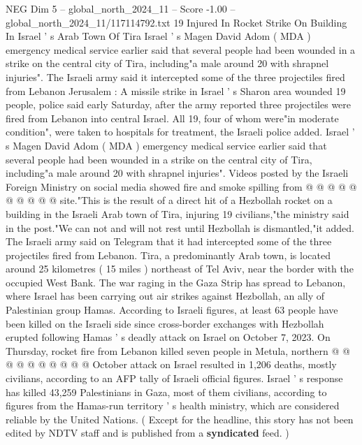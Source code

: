 \begin{textsample}{NEG Dim 5 – global\_north\_2024\_11 – Score -1.00 – global\_north\_2024\_11/117114792.txt}  \label{ex:f5_neg_413}
19 Injured In Rocket Strike On Building In Israel ' s Arab Town Of Tira Israel ' s Magen David Adom ( MDA ) emergency medical service earlier said that several people had been wounded in a strike on the central city of Tira, including"a male around 20 with shrapnel injuries".
The Israeli army said it intercepted some of the three projectiles fired from Lebanon Jerusalem : A missile strike in Israel ' s Sharon area wounded 19 people, police said early Saturday, after the army reported three projectiles were fired from Lebanon into central Israel.
All 19, four of whom were"in moderate condition", were taken to hospitals for treatment, the Israeli police added.
Israel ' s Magen David Adom ( MDA ) emergency medical service earlier said that several people had been wounded in a strike on the central city of Tira, including"a male around 20 with shrapnel injuries".
Videos posted by the Israeli Foreign Ministry on social media showed fire and smoke spilling from @ @ @ @ @ @ @ @ @ @ site."This is the result of a direct hit of a Hezbollah rocket on a building in the Israeli Arab town of Tira, injuring 19 civilians,"the ministry said in the post."We can not and will not rest until Hezbollah is dismantled,"it added.
The Israeli army said on Telegram that it had intercepted some of the three projectiles fired from Lebanon.
Tira, a predominantly Arab town, is located around 25 kilometres ( 15 miles ) northeast of Tel Aviv, near the border with the occupied West Bank.
The war raging in the Gaza Strip has spread to Lebanon, where Israel has been carrying out air strikes against Hezbollah, an ally of Palestinian group Hamas.
According to Israeli figures, at least 63 people have been killed on the Israeli side since cross-border exchanges with Hezbollah erupted following Hamas ' s deadly attack on Israel on October 7, 2023.
On Thursday, rocket fire from Lebanon killed seven people in Metula, northern @ @ @ @ @ @ @ @ @ @ October attack on Israel resulted in 1,206 deaths, mostly civilians, according to an AFP tally of Israeli official figures.
Israel ' s response has killed 43,259 Palestinians in Gaza, most of them civilians, according to figures from the Hamas-run territory ' s health ministry, which are considered reliable by the United Nations. ( Except for the headline, this story has not been edited by NDTV staff and is published from a \textbf{syndicated} feed. )

\end{textsample}
